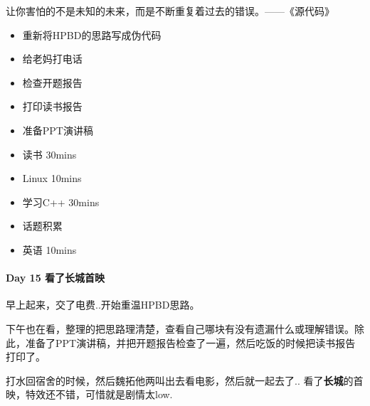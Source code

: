 \documentclass[UTF8,a4paper,8pt]{ctexbook}
\begin{document}
			 	 让你害怕的不是未知的未来，而是不断重复着过去的错误。——《源代码》
			 	 \begin{itemize}
			 	 	\item  \makebox[0pt][l]{$\square$}\raisebox{.15ex}{\hspace{0.1em}$\checkmark$}重新将HPBD的思路写成伪代码
			 	 	\item  \makebox[0pt][l]{$\square$}\raisebox{.15ex}{\hspace{0.1em}$\checkmark$}给老妈打电话
			 	 	\item  \makebox[0pt][l]{$\square$}\raisebox{.15ex}{\hspace{0.1em}$\checkmark$}检查开题报告
			 	 	\item  \makebox[0pt][l]{$\square$}\raisebox{.15ex}{\hspace{0.1em}$\checkmark$}打印读书报告
			 	 	\item  \makebox[0pt][l]{$\square$}\raisebox{.15ex}{\hspace{0.1em}$\checkmark$}准备PPT演讲稿
			 	 	
			 	 	\item  \makebox[0pt][l]{$\square$}\raisebox{.15ex}{\hspace{0.1em}$\checkmark$}读书 30mins	
			 	 	\item  Linux 10mins	  
			 	 	\item  学习C++ 30mins
			 	 	
			 	 	\item  \makebox[0pt][l]{$\square$}\raisebox{.15ex}{\hspace{0.1em}$\checkmark$}话题积累 	
			 	 	\item  英语 10mins 	  
			 	 \end{itemize}

 	 \paragraph{Day 15   看了长城首映   \quad     }
 	 
			 	 早上起来，交了电费..开始重温HPBD思路。
			 	 
			 	 下午也在看，整理的把思路理清楚，查看自己哪块有没有遗漏什么或理解错误。除此，准备了PPT演讲稿，并把开题报告检查了一遍，然后吃饭的时候把读书报告打印了。
			 	 
			 	 打水回宿舍的时候，然后魏拓他两叫出去看电影，然后就一起去了.. 看了\textbf{长城}的首映，特效还不错，可惜就是剧情太low.
			 	 			 	 
\end{document}
